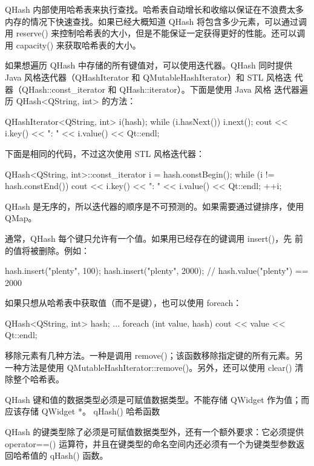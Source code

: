 QHash 内部使用哈希表来执行查找。哈希表自动增长和收缩以保证在不浪费太多内存的情况下快速查找。如果已经大概知道 QHash 将包含多少元素，可以通过调用 reserve() 来控制哈希表的大小，但是不能保证一定获得更好的性能。还可以调用 capacity() 来获取哈希表的大小。

如果想遍历 QHash 中存储的所有键值对，可以使用迭代器。QHash 同时提供
Java 风格迭代器（QHashIterator 和 QMutableHashIterator）和 STL 风格迭
代器（QHash::const\_iterator 和 QHash::iterator）。下面是使用 Java 风格
迭代器遍历 QHash<QString, int> 的方法：

\begin{cppcode}
QHashIterator<QString, int> i(hash);
while (i.hasNext()) {
    i.next();
    cout << i.key() << ": " << i.value() << Qt::endl;
}
\end{cppcode}

下面是相同的代码，不过这次使用 STL 风格迭代器：

\begin{cppcode}
QHash<QString, int>::const_iterator i = hash.constBegin();
while (i != hash.constEnd()) {
    cout << i.key() << ": " << i.value() << Qt::endl;
    ++i;
}
\end{cppcode}

QHash 是无序的，所以迭代器的顺序是不可预测的。如果需要通过键排序，使用 QMap。

通常，QHash 每个键只允许有一个值。如果用已经存在的键调用 insert()，先
前的值将被删除。例如：


\begin{cppcode}
hash.insert("plenty", 100);
hash.insert("plenty", 2000);
// hash.value("plenty") == 2000
\end{cppcode}

如果只想从哈希表中获取值（而不是键），也可以使用 foreach：

\begin{cppcode}
QHash<QString, int> hash;
...
foreach (int value, hash)
    cout << value << Qt::endl;
\end{cppcode}

移除元素有几种方法。一种是调用 remove()；该函数移除指定键的所有元素。另一种方法是使用 QMutableHashIterator::remove()。另外，还可以使用 clear() 清除整个哈希表。

QHash 键和值的数据类型必须是可赋值数据类型。不能存储 QWidget 作为值；而应该存储 QWidget *。
qHash() 哈希函数

QHash 的键类型除了必须是可赋值数据类型外，还有一个额外要求：它必须提供 operator==() 运算符，并且在键类型的命名空间内还必须有一个为键类型参数返回哈希值的 qHash() 函数。

